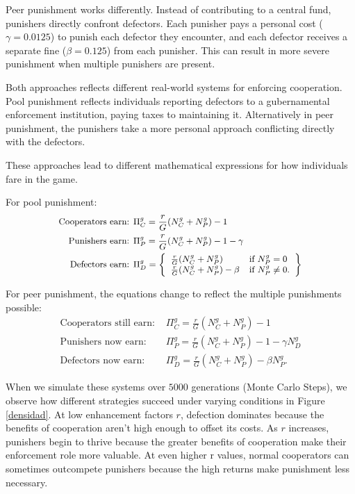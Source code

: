Peer punishment works differently. Instead of contributing to a central fund, punishers directly confront defectors. Each punisher pays a personal cost (${\gamma=0.0125}$) to punish each defector they encounter, and each defector receives a separate fine ($\beta=0.125$) from each punisher. This can result in more severe punishment when multiple punishers are present.

Both approaches reflects different real-world systems for enforcing cooperation. Pool punishment reflects individuals reporting defectors to a gubernamental enforcement institution, paying taxes to maintaining it. Alternatively in peer punishment, the punishers take a more personal approach conflicting directly with the defectors.


These approaches lead to different mathematical expressions for how individuals fare in the game.

For pool punishment:
\begin{equation}\small
\begin{split}
\text{Cooperators earn: } &\Pi_C^g=\frac{r}{G}(N_C^g+N_P^g)-1 \\
\text{Punishers earn: } &\Pi_P^g=\frac{r}{G}(N_C^g+N_P^g)-1-\gamma \\
\text{Defectors earn: } &\Pi_D^g = \left\{ \begin{array}{ll}
\frac{r}{G}(N_C^g+N_P^g) & \mbox{if $N_P^g=0$} \\
\frac{r}{G}(N_C^g+N_P^g)-\beta & \mbox{if $N_P^g\neq0$}.
\end{array}
\right\}
\end{split}
\end{equation}


For peer punishment, the equations change to reflect the multiple punishments possible:
\begin{equation}
\begin{split}
\text{Cooperators still earn: } &\Pi_C^g=\frac{r}{G}(N_C^g+N_P^g)-1 \\
\text{Punishers now earn: } &\Pi_P^g=\frac{r}{G}(N_C^g+N_P^g)-1-\gamma N_D^g \\
\text{Defectors now earn: } &\Pi_D^g=\frac{r}{G}(N_C^g+N_P^g)-\beta N_P^g.
\end{split}    
\end{equation}



When we simulate these systems over $5000$ generations (Monte Carlo Steps), we observe how different strategies succeed under varying conditions in Figure \ref{densidad}. At low enhancement factors $r$, defection dominates because the benefits of cooperation aren't high enough to offset its costs. As $r$ increases, punishers begin to thrive because the greater benefits of cooperation make their enforcement role more valuable. At even higher r values, normal cooperators can sometimes outcompete punishers because the high returns make punishment less necessary.

